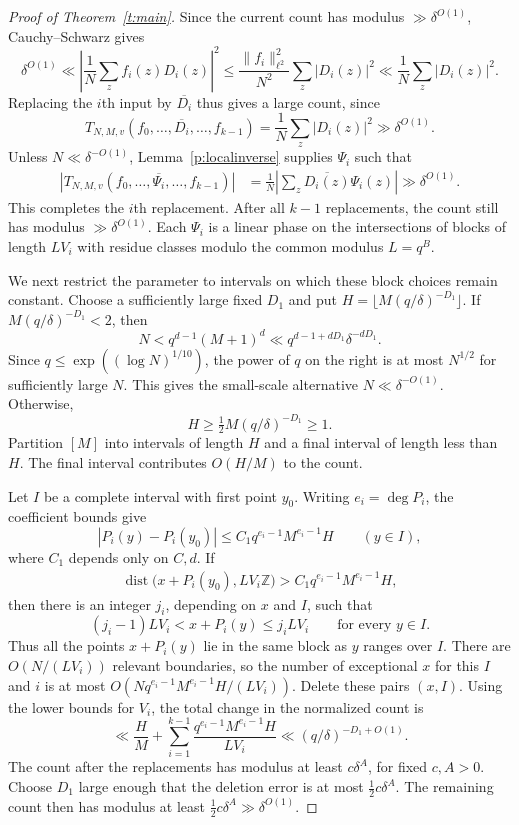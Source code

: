 \documentclass[12pt]{amsart}
\newcommand{\1}{\mathbf 1}
\theoremstyle{definition}
\begin{document}
\begin{proof}[Proof of Theorem~\ref{t:main}]
Since the current count has modulus $\gg\delta^{O(1)}$,
Cauchy--Schwarz gives
\[
 \delta^{O(1)}
 \ll \left|\frac1N\sum_z f_i(z)D_i(z)\right|^2
 \leq \frac{\|f_i\|_{\ell^2}^2}{N^2}\sum_z|D_i(z)|^2
 \ll \frac1N\sum_z|D_i(z)|^2.
\]
Replacing the $i$th input by $\overline{D_i}$ thus gives a
large count, since
\[
 T_{N,M,v}(f_0,\ldots,\overline{D_i},\ldots,f_{k-1})
 =\frac1N\sum_z|D_i(z)|^2
 \gg\delta^{O(1)}.
\]
Unless $N\ll\delta^{-O(1)}$, Lemma~\ref{p:localinverse} supplies
$\Psi_i$ such that
\[
\begin{aligned}
 \left|T_{N,M,v}
       (f_0,\ldots,\overline{\Psi_i},\ldots,f_{k-1})\right|
 &=\frac1N\left|\sum_z\overline{D_i(z)}\Psi_i(z)\right|
 \gg\delta^{O(1)}.
\end{aligned}
\]
This completes the $i$th replacement. After all $k-1$ replacements,
the count still has modulus $\gg\delta^{O(1)}$. Each $\Psi_i$ is
a linear phase on the intersections of blocks of length $LV_i$
with residue classes modulo the common modulus $L=q^B$.

We next restrict the parameter to intervals on which these block
choices remain constant. Choose a sufficiently large fixed $D_1$
and put $H=\lfloor M(q/\delta)^{-D_1}\rfloor$. If
$M(q/\delta)^{-D_1}<2$, then
\[
 N<q^{d-1}(M+1)^d
 \ll q^{d-1+dD_1}\delta^{-dD_1}.
\]
Since $q\leq\exp((\log N)^{1/10})$, the power of $q$ on the
right is at most $N^{1/2}$ for sufficiently large $N$. This
gives the small-scale alternative $N\ll\delta^{-O(1)}$.
Otherwise,
\[
 H\geq \tfrac12 M(q/\delta)^{-D_1}\geq1.
\]
Partition $[M]$ into intervals of length $H$ and a final interval
of length less than $H$. The final interval contributes $O(H/M)$
to the count.

Let $I$ be a complete interval with first point $y_0$. Writing
$e_i=\deg P_i$, the coefficient bounds give
\[
 |P_i(y)-P_i(y_0)|
 \leq C_1q^{e_i-1}M^{e_i-1}H
 \qquad (y\in I),
\]
where $C_1$ depends only on $C,d$. If
\begin{align}\label{e:distancecondition}
    \operatorname{dist} \bigl(x+P_i(y_0),LV_i\mathbb Z\bigr)
 >C_1q^{e_i-1}M^{e_i-1}H,
\end{align}
then there is an integer $j_i$, depending on $x$ and $I$, such that
\[
 (j_i-1)LV_i<x+P_i(y)\leq j_iLV_i
 \qquad\text{for every }y\in I.
\]
Thus all the points $x+P_i(y)$ lie in the same block as $y$ ranges
over $I$.
There are $O(N/(LV_i))$ relevant boundaries, so the number of
exceptional $x$ for this $I$ and $i$ is at most
$O(Nq^{e_i-1}M^{e_i-1}H/(LV_i))$. Delete these pairs $(x,I)$.
Using the lower bounds for $V_i$, the total change in the
normalized count is
\[
 \ll \frac HM+
       \sum_{i=1}^{k-1}
       \frac{q^{e_i-1}M^{e_i-1}H}{LV_i}
 \ll (q/\delta)^{-D_1+O(1)}.
\]
The count after the replacements has modulus at least
$c\delta^A$, for fixed $c,A>0$. Choose $D_1$ large enough
that the deletion error is at most $\frac12c\delta^A$.
The remaining count then has modulus at least
$\frac12c\delta^A\gg\delta^{O(1)}$.


\end{proof}
\end{document}
